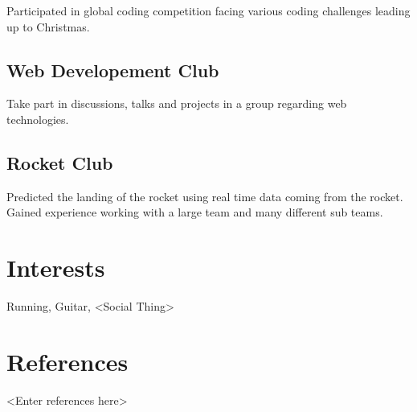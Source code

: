 \documentclass{article}
\begin{document}
Participated in global coding competition facing various coding challenges
leading up to Christmas.

\subsection{Web Developement Club}

Take part in discussions, talks and projects in a group regarding web 
technologies.

\subsection{Rocket Club}

Predicted the landing of the rocket using real time data coming from the rocket. 
Gained experience working with a large team and many different sub teams.

\section{Interests}

Running, Guitar, <Social Thing>

\section{References}

<Enter references here>
\end{document}
